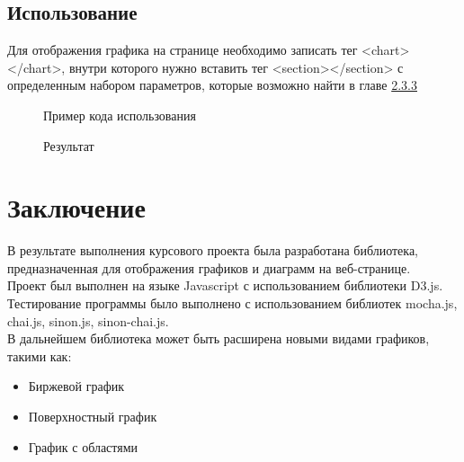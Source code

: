 \documentclass[a4paper,14pt]{extreport}
\begin{document}
\section{Использование}
\hspace{4ex}Для отображения графика на странице необходимо записать тег <chart></chart>, внутри которого нужно вставить тег <section></section> с определенным набором параметров, которые возможно найти в главе \hyperref[2.3.3]{2.3.3}
\newpage
\begin{figure}[h]
\caption{Пример кода использования}
\label{ris:image}
\end{figure}
\begin{figure}[h]
\caption{Результат}
\label{ris:image}
\end{figure}
\newpage
{}
\chapter*{Заключение}
\hspace{4ex}В результате выполнения курсового проекта была разработана библиотека, предназначенная для отображения графиков и диаграмм на веб-странице.\\
\hspace{4ex}Проект был выполнен на языке Javascript с использованием библиотеки D3.js. Тестирование программы было выполнено с использованием библиотек mocha.js, chai.js, sinon.js, sinon-chai.js.\\
\hspace{4ex}В дальнейшем библиотека может быть расширена новыми видами графиков, такими как:
\begin{itemize}
	\item Биржевой график
	\item Поверхностный график
	\item График с областями
\end{itemize}
\newpage
{}
\end{document}
